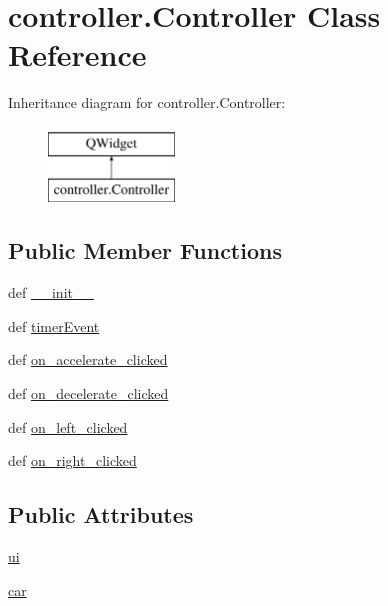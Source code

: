 \hypertarget{classcontroller_1_1Controller}{}\section{controller.\+Controller Class Reference}
\label{classcontroller_1_1Controller}
Inheritance diagram for controller.\+Controller\+:\begin{figure}[H]
\begin{center}
\leavevmode
\includegraphics[height=2.000000cm]{classcontroller_1_1Controller}
\end{center}
\end{figure}
\subsection*{Public Member Functions}
\begin{DoxyCompactItemize}
\item 
def \hyperlink{classcontroller_1_1Controller_a7888c7c46271d2b2acfd65555aaaa7af}{\+\_\+\+\_\+init\+\_\+\+\_\+}
\item 
def \hyperlink{classcontroller_1_1Controller_aa669345aebab311fed537eed0208871d}{timer\+Event}
\item 
def \hyperlink{classcontroller_1_1Controller_afaefff20956a76f22440ffb07b11ce74}{on\+\_\+accelerate\+\_\+clicked}
\item 
def \hyperlink{classcontroller_1_1Controller_a09e82a85604e0cdeec03ed3707a2d7b7}{on\+\_\+decelerate\+\_\+clicked}
\item 
def \hyperlink{classcontroller_1_1Controller_a71c64437600c24759ef390d74f83f038}{on\+\_\+left\+\_\+clicked}
\item 
def \hyperlink{classcontroller_1_1Controller_a48b14d54e7a0ac51d15dd084f4cb6330}{on\+\_\+right\+\_\+clicked}
\end{DoxyCompactItemize}
\subsection*{Public Attributes}
\begin{DoxyCompactItemize}
\item 
\hyperlink{classcontroller_1_1Controller_a3c8899257d667c873d706408585f72a6}{ui}
\item 
\hyperlink{classcontroller_1_1Controller_ab694a13d8909ceda2a3e04d82f4352ac}{car}
\end{DoxyCompactItemize}


